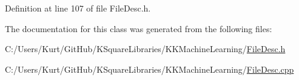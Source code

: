 Definition at line 107 of file File\+Desc.\+h.



The documentation for this class was generated from the following files\+:\begin{DoxyCompactItemize}
\item 
C\+:/\+Users/\+Kurt/\+Git\+Hub/\+K\+Square\+Libraries/\+K\+K\+Machine\+Learning/\hyperlink{_file_desc_8h}{File\+Desc.\+h}\item 
C\+:/\+Users/\+Kurt/\+Git\+Hub/\+K\+Square\+Libraries/\+K\+K\+Machine\+Learning/\hyperlink{_file_desc_8cpp}{File\+Desc.\+cpp}\end{DoxyCompactItemize}

